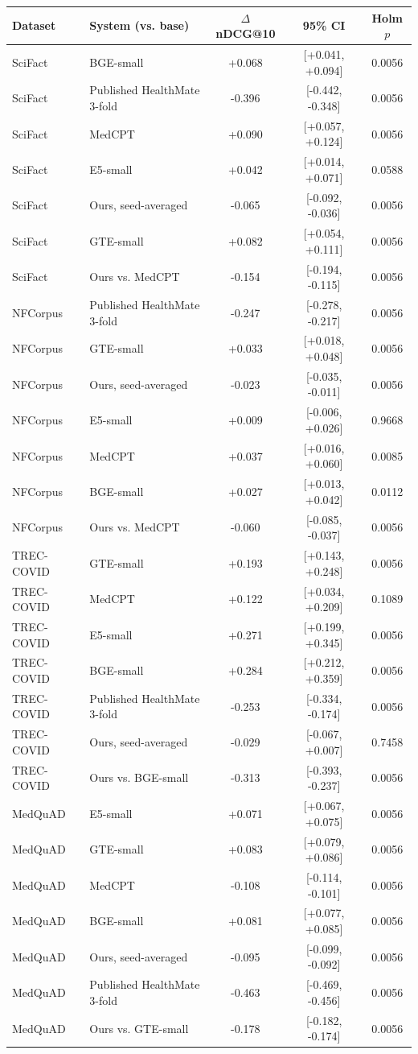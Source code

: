 \begin{tabular}{llccc}
\toprule
Dataset & System (vs. base) & $\Delta$ nDCG@10 & 95\% CI & Holm $p$ \\
\midrule
SciFact & BGE-small & +0.068 & [+0.041, +0.094] & 0.0056 \\
SciFact & Published HealthMate 3-fold & -0.396 & [-0.442, -0.348] & 0.0056 \\
SciFact & MedCPT & +0.090 & [+0.057, +0.124] & 0.0056 \\
SciFact & E5-small & +0.042 & [+0.014, +0.071] & 0.0588 \\
SciFact & Ours, seed-averaged & -0.065 & [-0.092, -0.036] & 0.0056 \\
SciFact & GTE-small & +0.082 & [+0.054, +0.111] & 0.0056 \\
SciFact & Ours vs. MedCPT & -0.154 & [-0.194, -0.115] & 0.0056 \\
\midrule
NFCorpus & Published HealthMate 3-fold & -0.247 & [-0.278, -0.217] & 0.0056 \\
NFCorpus & GTE-small & +0.033 & [+0.018, +0.048] & 0.0056 \\
NFCorpus & Ours, seed-averaged & -0.023 & [-0.035, -0.011] & 0.0056 \\
NFCorpus & E5-small & +0.009 & [-0.006, +0.026] & 0.9668 \\
NFCorpus & MedCPT & +0.037 & [+0.016, +0.060] & 0.0085 \\
NFCorpus & BGE-small & +0.027 & [+0.013, +0.042] & 0.0112 \\
NFCorpus & Ours vs. MedCPT & -0.060 & [-0.085, -0.037] & 0.0056 \\
\midrule
TREC-COVID & GTE-small & +0.193 & [+0.143, +0.248] & 0.0056 \\
TREC-COVID & MedCPT & +0.122 & [+0.034, +0.209] & 0.1089 \\
TREC-COVID & E5-small & +0.271 & [+0.199, +0.345] & 0.0056 \\
TREC-COVID & BGE-small & +0.284 & [+0.212, +0.359] & 0.0056 \\
TREC-COVID & Published HealthMate 3-fold & -0.253 & [-0.334, -0.174] & 0.0056 \\
TREC-COVID & Ours, seed-averaged & -0.029 & [-0.067, +0.007] & 0.7458 \\
TREC-COVID & Ours vs. BGE-small & -0.313 & [-0.393, -0.237] & 0.0056 \\
\midrule
MedQuAD & E5-small & +0.071 & [+0.067, +0.075] & 0.0056 \\
MedQuAD & GTE-small & +0.083 & [+0.079, +0.086] & 0.0056 \\
MedQuAD & MedCPT & -0.108 & [-0.114, -0.101] & 0.0056 \\
MedQuAD & BGE-small & +0.081 & [+0.077, +0.085] & 0.0056 \\
MedQuAD & Ours, seed-averaged & -0.095 & [-0.099, -0.092] & 0.0056 \\
MedQuAD & Published HealthMate 3-fold & -0.463 & [-0.469, -0.456] & 0.0056 \\
MedQuAD & Ours vs. GTE-small & -0.178 & [-0.182, -0.174] & 0.0056 \\
\bottomrule
\end{tabular}
